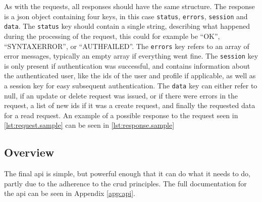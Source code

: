 As with the requests, all responses should have the same structure. The response is a \ac{json} object containing four keys, in this
case \lstinline|status|, \lstinline|errors|, \lstinline|session| and \lstinline|data|. The \lstinline|status| key should contain a single string, describing what happened during the
processing of the request, this could for example be ``OK'', ``SYNTAXERROR'', or ``AUTHFAILED''. The \lstinline|errors| key refers to an array of error
messages, typically an empty array if everything went fine. The \lstinline|session| key is only present if authentication was successful, and contains information
about the authenticated user, like the ids of the user and profile if applicable, as well as a session key for easy subsequent authentication.  The \lstinline|data| key
can either refer to null, if an update or delete request was issued, or if there were errors in the request, a list of new ids if it was a create request, and finally
the requested data for a read request. An example of a possible response to the request seen in \autoref{lst:request.sample} can be seen in \autoref{lst:response.sample}



\subsection{Overview}

The final \ac{api} is simple, but powerful enough that it can do what it needs to do, partly due to the adherence to the \ac{crud} principles. The full
documentation for the \ac{api} can be seen in Appendix \autoref{app:api}.
